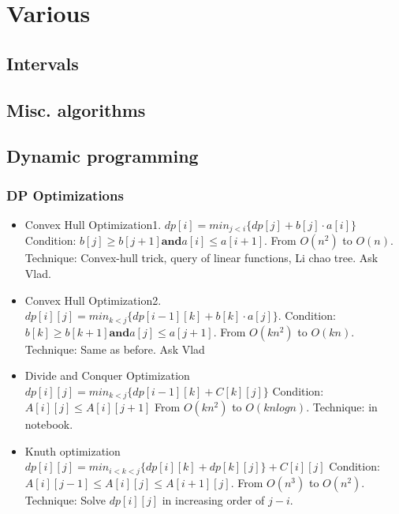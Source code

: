 \chapter{Various}

\section{Intervals}

\section{Misc. algorithms}

\section{Dynamic programming}
    \subsection{DP Optimizations}
        \begin{itemize}
            \item Convex Hull Optimization1.
                  $dp[i]=min_{j<i} \{dp[j]+b[j]\cdot a[i]\}$
                  Condition: $b[j] \geq b[j + 1] \textbf{and} a[i]\leq a[i+1]$.
                  From $O(n^2)$ to $O(n)$. Technique: Convex-hull trick, query of linear functions, Li chao tree. Ask Vlad.
            \item Convex Hull Optimization2.
                  $dp[i][j] = min_{k<j}\{dp[i-1][k]+b[k]\cdot a[j]\}$.
                  Condition: $b[k] \geq b[k+1] \textbf{and} a[j] \leq a[j+1]$.
                  From $O(kn^2)$ to $O(kn)$. Technique: Same as before. Ask Vlad
            \item Divide and Conquer Optimization
                  $dp[i][j] = min_{k<j} \{ dp[i-1][k] + C[k][j] \} $
                  Condition: $A[i][j] \leq A[i][j + 1]$
                  From $O(kn^2)$ to $O(kn logn)$. Technique: in notebook.
            \item Knuth optimization
                  $dp[i][j] = min_{i<k<j} \{ dp[i][k] + dp[k][j] \} + C[i][j]$
                  Condition: $A[i][j-1] \leq A[i][j] \leq A[i + 1][j]$.
                  From $O(n^3)$ to $O(n^2)$. Technique: Solve $dp[i][j]$ in increasing order of $j-i$.
        \end{itemize}


